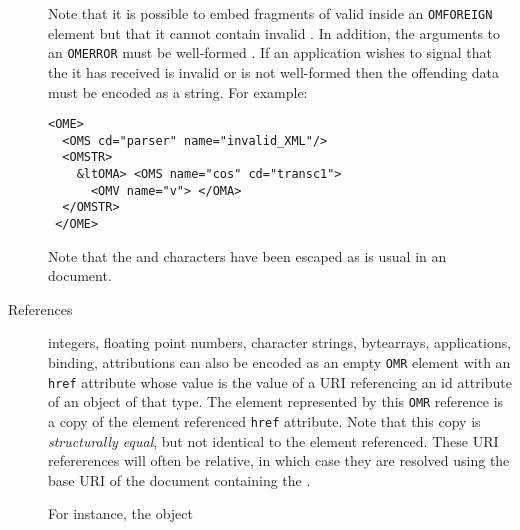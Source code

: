 \begin{description}
 Note that it is possible to embed fragments
of valid \OM inside an \lstinline|OMFOREIGN| element but that it
cannot contain invalid \OM.  In addition, the arguments to an
\lstinline|OMERROR| must be well-formed \XML.  If an
application wishes to signal that the \OM it has received is invalid or
is not well-formed then the offending data must be encoded as a string.
For example:
\begin{lstlisting}
<OME>
  <OMS cd="parser" name="invalid_XML"/>  
  <OMSTR>
    &ltOMA> <OMS name="cos" cd="transc1">
      <OMV name="v"> </OMA>
  </OMSTR> 
 </OME>
\end{lstlisting}
Note that the \textquote{<} and \textquote{>} characters have been escaped as is usual in
an \XML document.
\item[References] \OM integers, floating point numbers, character strings, bytearrays,
  applications, binding, attributions can also be encoded as an empty \lstinline|OMR|
  element with an \lstinline|href| attribute whose value is the value of a URI referencing
  an id attribute of an \OM object of that type.  The \OM element represented by this
  \lstinline|OMR| reference is a copy of the \OM element referenced \lstinline|href|
  attribute. Note that this copy is \emph{structurally equal}, but not identical to the
  element referenced. These URI refererences will often be relative, in which case they
  are resolved using the base URI of the document containing the \OM.

 For instance, the \OM object


\end{description}
